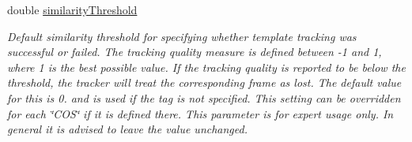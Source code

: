 \begin{DoxyCompactItemize}
double \hyperlink{class_a_rdev_kit_1_1_model_1_1_project_1_1_markerless_sensor_aacf707617c0782991ff6f490aabcf37d}{similarity\-Threshold}
\begin{DoxyCompactList}\small\item\em Default similarity threshold for specifying whether template tracking was successful or failed. The tracking quality measure is defined between -\/1 and 1, where 1 is the best possible value. If the tracking quality is reported to be below the threshold, the tracker will treat the corresponding frame as lost. The default value for this is 0. and is used if the tag is not specified. This setting can be overridden for each \char`\"{}\-C\-O\-S\char`\"{} if it is defined there. This parameter is for expert usage only. In general it is advised to leave the value unchanged. \end{DoxyCompactList}\end{DoxyCompactItemize}

